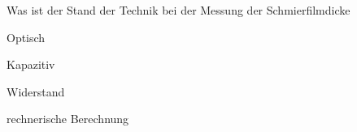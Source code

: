 Was ist der Stand der Technik bei der Messung der Schmierfilmdicke

Optisch

Kapazitiv

Widerstand

rechnerische Berechnung

